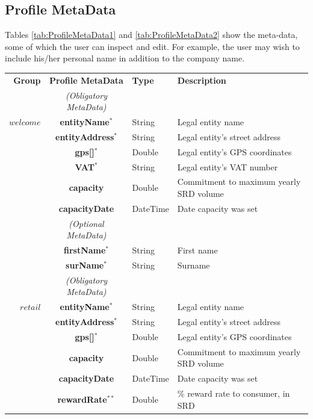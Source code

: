 \subsection{Profile MetaData}
Tables \ref{tab:ProfileMetaData1} and \ref{tab:ProfileMetaData2} show the meta-data, some of which the user can inspect and edit. For example, the user may wish to include his/her personal name in addition to the company name.

\setlength{\tabcolsep}{10pt}
\begin{table}[H]
\begin{centering}
\small
{
\begin{tabular}{ r | c | l | l }
\hline
\textbf{Group}	& {\bf Profile MetaData} & {\bf Type} & {\bf Description} \\
\Xhline{1.5pt}
			& \emph{(Obligatory MetaData)} & & \\
\cline{2-2}
$welcome$	& {\bf entityName}$^*$		&String	& Legal entity name \\
			& {\bf entityAddress}$^*$		&String	& Legal entity's street address \\
			& {\bf gps[]}$^*$			&Double	& Legal entity's GPS coordinates \\			
			& {\bf VAT}$^*$				&String	& Legal entity's VAT number \\
			& {\bf capacity}				&Double	& Commitment to maximum yearly SRD volume \\
			& {\bf capacityDate}			&DateTime & Date capacity was set \\
\cline{2-2}
			 & \emph{(Optional MetaData)}& & \\
\cline{2-2}
			& {\bf firstName}$^*$			&String	& First name \\
			& {\bf surName}$^*$			&String	& Surname \\
\Xhline{1.5pt}
			& \emph{(Obligatory MetaData)} & & \\
\cline{2-2}
$retail$		& {\bf entityName}$^*$		&String	& Legal entity name \\
			& {\bf entityAddress}$^*$		&String	& Legal entity's street address \\
			& {\bf gps[]}$^*$			&Double	& Legal entity's GPS coordinates \\			
			& {\bf capacity}				&Double	& Commitment to maximum yearly SRD volume \\
			& {\bf capacityDate}			&DateTime & Date capacity was set \\
			& {\bf rewardRate}$^{**}$		&Double	& \% reward rate to consumer, in SRD \\

\end{tabular}}
\end{centering}
\end{table}
